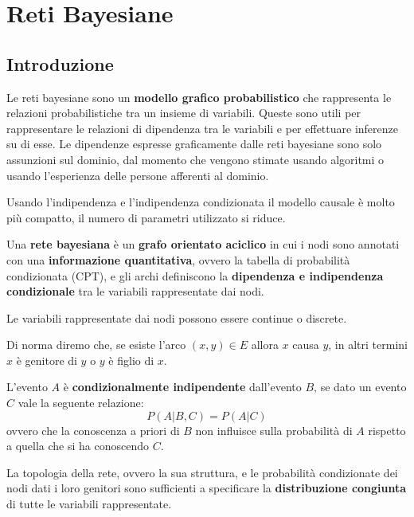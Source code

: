 \chapter{Reti Bayesiane} \label{cap:RetiBayesiane}
\section{Introduzione}
Le reti bayesiane sono un \textbf{modello grafico probabilistico} che rappresenta
le relazioni probabilistiche tra un insieme di variabili. Queste sono utili
per rappresentare le relazioni di dipendenza tra le variabili e per effettuare
inferenze su di esse. Le dipendenze espresse graficamente dalle reti bayesiane
sono solo assunzioni sul dominio, dal momento che vengono stimate usando
algoritmi o usando l'esperienza delle persone afferenti al dominio.

Usando l'indipendenza e l'indipendenza condizionata il modello causale è molto
più compatto, il numero di parametri utilizzato si riduce.
\begin{definizione}
    Una \textbf{rete bayesiana} è un \textbf{grafo orientato aciclico} in cui i
    nodi sono annotati con una \textbf{informazione quantitativa}, ovvero la
    tabella di probabilità condizionata (CPT), e gli archi definiscono la
    \textbf{dipendenza e indipendenza condizionale} tra le variabili
    rappresentate dai nodi.
\end{definizione}
\begin{nota}
    Le variabili rappresentate dai nodi possono essere continue o discrete.
\end{nota}
Di norma diremo che, se esiste l'arco $(x,y)\in E$ allora $x$ causa $y$, in altri
termini $x$ è genitore di $y$ o $y$ è figlio di $x$.
\begin{center}
\end{center}
\begin{definizione}
    L'evento $A$ è \textbf{condizionalmente indipendente} dall'evento $B$, se dato
    un evento $C$ vale la seguente relazione:
    \begin{equation}
        P(A|B,C) = P(A|C)
    \end{equation}
    ovvero che la conoscenza a priori di $B$ non influisce sulla probabilità di
    $A$ rispetto a quella che si ha conoscendo $C$.
\end{definizione}
La topologia della rete, ovvero la sua struttura, e le probabilità condizionate
dei nodi dati i loro genitori sono sufficienti a specificare la \textbf{distribuzione
    congiunta} di tutte le variabili rappresentate.

